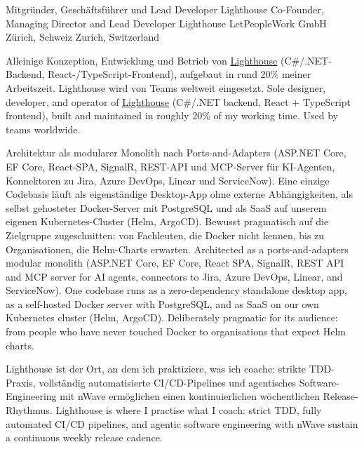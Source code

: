 \begin{cventries}
	\cventry
	{
			{Mitgründer, Geschäftsführer und Lead Developer Lighthouse}
			{Co-Founder, Managing Director and Lead Developer Lighthouse}
	} %
	{
		LetPeopleWork GmbH
	} %
	{
		{ Zürich, Schweiz }
		{ Zurich, Switzerland }		
	} %
	{
	} %
	{
		\begin{cvitems}
			\item {
				{Alleinige Konzeption, Entwicklung und Betrieb von \underline{\href{https://letpeople.work/lighthouse}{Lighthouse}} (C\#/.NET-Backend, React-/TypeScript-Frontend), aufgebaut in rund 20\% meiner Arbeitszeit. Lighthouse wird von Teams weltweit eingesetzt.}
				{Sole designer, developer, and operator of \underline{\href{https://letpeople.work/lighthouse}{Lighthouse}} (C\#/.NET backend, React + TypeScript frontend), built and maintained in roughly 20\% of my working time. Used by teams worldwide.}
			}
			\item {
				{Architektur als modularer Monolith nach Ports-and-Adapters (ASP.NET Core, EF Core, React-SPA, SignalR, REST-API und MCP-Server für KI-Agenten, Konnektoren zu Jira, Azure DevOps, Linear und ServiceNow). Eine einzige Codebasis läuft als eigenständige Desktop-App ohne externe Abhängigkeiten, als selbst gehosteter Docker-Server mit PostgreSQL und als SaaS auf unserem eigenen Kubernetes-Cluster (Helm, ArgoCD). Bewusst pragmatisch auf die Zielgruppe zugeschnitten: von Fachleuten, die Docker nicht kennen, bis zu Organisationen, die Helm-Charts erwarten.}
				{Architected as a ports-and-adapters modular monolith (ASP.NET Core, EF Core, React SPA, SignalR, REST API and MCP server for AI agents, connectors to Jira, Azure DevOps, Linear, and ServiceNow). One codebase runs as a zero-dependency standalone desktop app, as a self-hosted Docker server with PostgreSQL, and as SaaS on our own Kubernetes cluster (Helm, ArgoCD). Deliberately pragmatic for its audience: from people who have never touched Docker to organisations that expect Helm charts.}
			}
			\item {
				{Lighthouse ist der Ort, an dem ich praktiziere, was ich coache: strikte TDD-Praxis, vollständig automatisierte CI/CD-Pipelines und agentisches Software-Engineering mit nWave ermöglichen einen kontinuierlichen wöchentlichen Release-Rhythmus.}
				{Lighthouse is where I practise what I coach: strict TDD, fully automated CI/CD pipelines, and agentic software engineering with nWave sustain a continuous weekly release cadence.}
}
\end{cvitems}}
\end{cventries}
